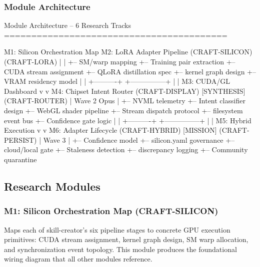 \documentclass[11pt,letterpaper]{article}
\begin{document}
\subsubsection{Module Architecture}

\begin{asciibox}
Module Architecture -- 6 Research Tracks
=========================================

M1: Silicon Orchestration Map      M2: LoRA Adapter Pipeline
    (CRAFT-SILICON)                    (CRAFT-LORA)
    |                                  |
    +-- SM/warp mapping                +-- Training pair extraction
    +-- CUDA stream assignment         +-- QLoRA distillation spec
    +-- kernel graph design            +-- VRAM residency model
                |                              |
                +----------+  +---------------+
                           |  |
M3: CUDA/GL Dashboard      v  v      M4: Chipset Intent Router
    (CRAFT-DISPLAY)    [SYNTHESIS]      (CRAFT-ROUTER)
    |                  Wave 2 Opus      |
    +-- NVML telemetry                 +-- Intent classifier design
    +-- WebGL shader pipeline          +-- Stream dispatch protocol
    +-- filesystem event bus           +-- Confidence gate logic
                |                              |
                +----------+  +---------------+
                           |  |
M5: Hybrid Execution       v  v      M6: Adapter Lifecycle
    (CRAFT-HYBRID)     [MISSION]        (CRAFT-PERSIST)
    |                  Wave 3           |
    +-- Confidence model               +-- silicon.yaml governance
    +-- cloud/local gate               +-- Staleness detection
    +-- discrepancy logging            +-- Community quarantine
\end{asciibox}

\subsection{Research Modules}

\subsubsection{M1: Silicon Orchestration Map (CRAFT-SILICON)}

Maps each of skill-creator's six pipeline stages to concrete GPU execution primitives: CUDA stream assignment, kernel graph design, SM warp allocation, and synchronization event topology. This module produces the foundational wiring diagram that all other modules reference.
\end{document}
